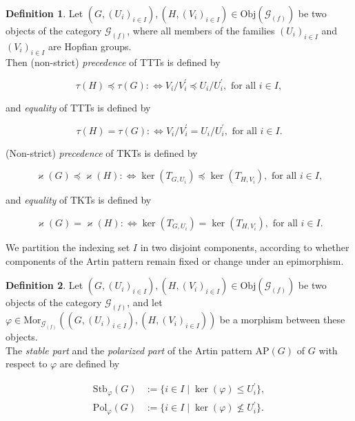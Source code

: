 \documentclass{amsart}
\theoremstyle{definition}
\newtheorem{definition}{Definition}[section]
\numberwithin{equation}{section}
\begin{document}
\begin{definition}
\label{dfn:poArtinPattern}
Let \((G,(U_i)_{i\in I}),(H,(V_i)_{i\in I})\in\mathrm{Obj}(\mathcal{G}_{(f)})\)
be two objects of the category \(\mathcal{G}_{(f)}\),
where all members of the families \((U_i)_{i\in I}\) and \((V_i)_{i\in I}\) are Hopfian groups.\\
Then (non-strict) \textit{precedence} of TTTs is defined by

\begin{equation}
\label{eqn:TTTPrecedence}
\tau(H)\preceq\tau(G)
:\Longleftrightarrow
V_i/V_i^\prime\preceq U_i/U_i^\prime, \text{ for all } i\in I,
\end{equation}

\noindent
and \textit{equality} of TTTs is defined by

\begin{equation}
\label{eqn:TTTEquality}
\tau(H)=\tau(G)
:\Longleftrightarrow
V_i/V_i^\prime=U_i/U_i^\prime, \text{ for all } i\in I.
\end{equation}

\noindent
(Non-strict) \textit{precedence} of TKTs is defined by

\begin{equation}
\label{eqn:TKTPrecedence}
\varkappa(G)\preceq\varkappa(H)
:\Longleftrightarrow
\ker(T_{G,U_i})\preceq\ker(T_{H,V_i}), \text{ for all } i\in I,
\end{equation}

\noindent
and \textit{equality} of TKTs is defined by

\begin{equation}
\label{eqn:TKTEquality}
\varkappa(G)=\varkappa(H)
:\Longleftrightarrow
\ker(T_{G,U_i})=\ker(T_{H,V_i}), \text{ for all } i\in I.
\end{equation}

\end{definition}


\noindent
We partition the indexing set \(I\) in two disjoint components,
according to whether components of the Artin pattern remain fixed or change
under an epimorphism.

\begin{definition}
\label{dfn:StbPol}
Let \((G,(U_i)_{i\in I}),(H,(V_i)_{i\in I})\in\mathrm{Obj}(\mathcal{G}_{(f)})\)
be two objects of the category \(\mathcal{G}_{(f)}\),
and let \(\varphi\in\mathrm{Mor}_{\mathcal{G}_{(f)}}((G,(U_i)_{i\in I}),(H,(V_i)_{i\in I}))\)
be a morphism between these objects.\\
The \textit{stable part} and the \textit{polarized part} of the Artin pattern \(\mathrm{AP}(G)\) of \(G\)
with respect to \(\varphi\) are defined by

\begin{equation}
\label{eqn:StbPol}
\begin{aligned}
\mathrm{Stb}_{\varphi}(G) &:= \lbrace i\in I\mid\ker(\varphi)\le U_i^\prime\rbrace, \\
\mathrm{Pol}_{\varphi}(G) &:= \lbrace i\in I\mid\ker(\varphi)\not\le U_i^\prime\rbrace.
\end{aligned}
\end{equation}

\end{definition}
\end{document}
